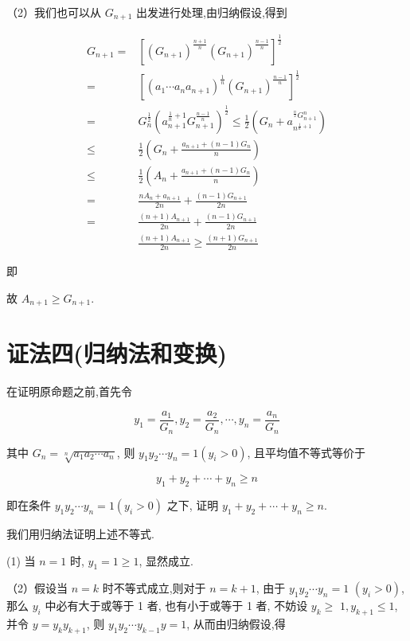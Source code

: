 （2）我们也可以从 $G_{n+1}$ 出发进行处理,由归纳假设,得到

$$
\begin{aligned}
G_{n+1}= & {\left[\left(G_{n+1}\right)^{\frac{n+1}{n}}\left(G_{n+1}\right)^{\frac{n-1}{n}}\right]^{\frac{1}{2}} } \\
= & {\left[\left(a_{1} \cdots a_{n} a_{n+1}\right)^{\frac{1}{n}}\left(G_{n+1}\right)^{\frac{n-1}{n}}\right]^{\frac{1}{2}} } \\
= & G_{n}^{\frac{1}{2}}\left(a_{n+1}^{\frac{1}{n}+1} G_{n+1}^{\frac{n-1}{n}}\right)^{\frac{1}{2}} \leqslant \frac{1}{2}\left(G_{n}+a_{n^{\frac{1}{n}+1}}^{{ }^{\frac{n}{2}} G_{n+1}^{n}}\right) \\
\leqslant & \frac{1}{2}\left(G_{n}+\frac{a_{n+1}+(n-1) G_{n}}{n}\right) \\
\leqslant & \frac{1}{2}\left(A_{n}+\frac{a_{n+1}+(n-1) G_{n}}{n}\right) \\
= & \frac{n A_{n}+a_{n+1}}{2 n}+\frac{(n-1) G_{n+1}}{2 n} \\
= & \frac{(n+1) A_{n+1}}{2 n}+\frac{(n-1) G_{n+1}}{2 n} \\
& \frac{(n+1) A_{n+1}}{2 n} \geqslant \frac{(n+1) G_{n+1}}{2 n}
\end{aligned}
$$

即

故 $A_{n+1} \geqslant G_{n+1}$.

\section*{证法四(归纳法和变换)}
在证明原命题之前,首先令

$$
y_{1}=\frac{a_{1}}{G_{n}}, y_{2}=\frac{a_{2}}{G_{n}}, \cdots, y_{n}=\frac{a_{n}}{G_{n}}
$$

其中 $G_{n}=\sqrt[n]{a_{1} a_{2} \cdots a_{n}}$, 则 $y_{1} y_{2} \cdots y_{n}=1\left(y_{i}>0\right)$, 且平均值不等式等价于

$$
y_{1}+y_{2}+\cdots+y_{n} \geqslant n
$$

即在条件 $y_{1} y_{2} \cdots y_{n}=1\left(y_{i}>0\right)$ 之下, 证明 $y_{1}+y_{2}+\cdots+y_{n} \geqslant n$.

我们用归纳法证明上述不等式.

(1) 当 $n=1$ 时, $y_{1}=1 \geqslant 1$, 显然成立.

（2）假设当 $n=k$ 时不等式成立,则对于 $n=k+1$, 由于 $y_{1} y_{2} \cdots y_{n}=1$ $\left(y_{i}>0\right)$, 那么 $y_{i}$ 中必有大于或等于 1 者, 也有小于或等于 1 者, 不妨设 $y_{k} \geqslant$ $1, y_{k+1} \leqslant 1$, 并令 $y=y_{k} y_{k+1}$, 则 $y_{1} y_{2} \cdots y_{k-1} y=1$, 从而由归纳假设,得

